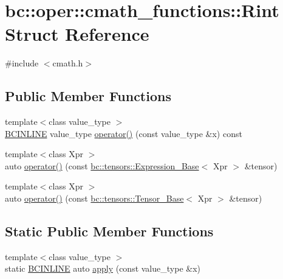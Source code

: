 \hypertarget{structbc_1_1oper_1_1cmath__functions_1_1Rint}{}\section{bc\+:\+:oper\+:\+:cmath\+\_\+functions\+:\+:Rint Struct Reference}
\label{structbc_1_1oper_1_1cmath__functions_1_1Rint}


{\ttfamily \#include $<$cmath.\+h$>$}

\subsection*{Public Member Functions}
\begin{DoxyCompactItemize}
\item 
{\footnotesize template$<$class value\+\_\+type $>$ }\\\hyperlink{common_8h_a6699e8b0449da5c0fafb878e59c1d4b1}{B\+C\+I\+N\+L\+I\+NE} value\+\_\+type \hyperlink{structbc_1_1oper_1_1cmath__functions_1_1Rint_a90ecf752368f9d25ad47a39369078aa5}{operator()} (const value\+\_\+type \&x) const
\item 
{\footnotesize template$<$class Xpr $>$ }\\auto \hyperlink{structbc_1_1oper_1_1cmath__functions_1_1Rint_ab484f3bb79ce1b4573190dc84290f055}{operator()} (const \hyperlink{classbc_1_1tensors_1_1Expression__Base}{bc\+::tensors\+::\+Expression\+\_\+\+Base}$<$ Xpr $>$ \&tensor)
\item 
{\footnotesize template$<$class Xpr $>$ }\\auto \hyperlink{structbc_1_1oper_1_1cmath__functions_1_1Rint_a6d65617f1f0fe7920b4df83cef71ce82}{operator()} (const \hyperlink{classbc_1_1tensors_1_1Tensor__Base}{bc\+::tensors\+::\+Tensor\+\_\+\+Base}$<$ Xpr $>$ \&tensor)
\end{DoxyCompactItemize}
\subsection*{Static Public Member Functions}
\begin{DoxyCompactItemize}
\item 
{\footnotesize template$<$class value\+\_\+type $>$ }\\static \hyperlink{common_8h_a6699e8b0449da5c0fafb878e59c1d4b1}{B\+C\+I\+N\+L\+I\+NE} auto \hyperlink{structbc_1_1oper_1_1cmath__functions_1_1Rint_aa8d0d7b3475cde268d43a3c8c3ff7060}{apply} (const value\+\_\+type \&x)
\end{DoxyCompactItemize}


